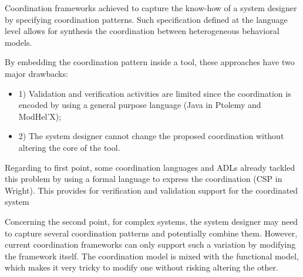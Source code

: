 Coordination frameworks achieved to capture the know-how of a system designer by specifying coordination patterns. Such specification defined at the language level allows for synthesis the coordination between heterogeneous behavioral models. %

By embedding the coordination pattern inside a tool, these approaches have two major drawbacks:
\begin{itemize}
	\item 1) Validation and verification activities are limited since the coordination is encoded by using a general purpose language (\eg Java in Ptolemy and ModHel'X);
	\item 2) The system designer cannot change the proposed coordination without altering the core of the tool.  
\end{itemize}
Regarding to first point, some coordination languages and ADLs already tackled this problem by using a formal language to express the coordination (\eg CSP in Wright). This provides for verification and validation support for the coordinated system

Concerning the second point, for complex systems, the system designer may need to capture several coordination patterns and potentially combine them. However, current coordination frameworks can only support such a variation by modifying the framework itself. The coordination model is mixed with the functional model, which makes it very tricky to modify one without risking altering the other.





